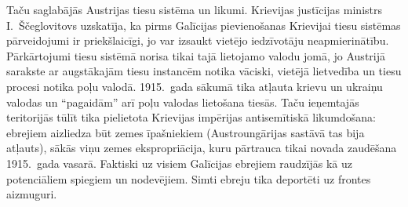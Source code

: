 \documentclass[twoside,a5paper,12pt,fleqn,openany]{extbook}
\begin{document}
Taču saglabājās Austrijas tiesu sistēma un likumi. Krievijas justīcijas ministrs I.~Ščeglovitovs uzskatīja, ka pirms Galīcijas pievienošanas Krievijai tiesu sistēmas pārveidojumi ir priekšlaicīgi, jo var izsaukt vietējo iedzīvotāju neapmierinātību. Pārkārtojumi tiesu sistēmā norisa tikai tajā lietojamo valodu jomā, jo Austrijā sarakste ar augstākajām tiesu instancēm notika vāciski, vietējā lietvedība un tiesu procesi notika poļu valodā. 1915.~gada sākumā tika atļauta krievu un ukraiņu valodas un ``pagaidām'' arī poļu valodas lietošana tiesās. Taču ieņemtajās teritorijās tūlīt tika pielietota Krievijas impērijas antisemītiskā likumdošana: ebrejiem aizliedza būt zemes īpašniekiem (Austroungārijas sastāvā tas bija atļauts), sākās viņu zemes ekspropriācija, kuru pārtrauca tikai novada zaudēšana 1915.~gada vasarā. Faktiski uz visiem Galīcijas ebrejiem raudzījās kā uz potenciāliem spiegiem un nodevējiem. Simti ebreju tika deportēti uz frontes aizmuguri.
\end{document}
